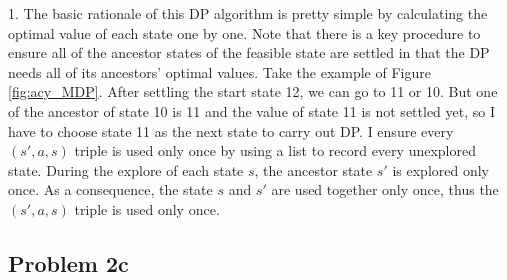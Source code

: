 \documentclass[paper=a4, fontsize=10pt]{scrartcl} %
\numberwithin{equation}{section} %
\numberwithin{figure}{section} %
\numberwithin{table}{section} %
\begin{document}
\begin{spacing}{1.}
The basic rationale of this DP algorithm is pretty simple by calculating the optimal value of each state one by one. Note that there is a key procedure to ensure all of the ancestor states of the feasible state are settled in that the DP needs all of its ancestors' optimal values. Take the example of Figure \ref{fig:acy_MDP}. After settling the start state 12, we can go to 11 or 10. But one of the ancestor of state 10 is 11 and the value of state 11 is not settled yet, so I have to choose state 11 as the next state to carry out DP. I ensure every $(s', a, s)$ triple is used only once by using a list to record every unexplored state. During the explore of each state $s$, the ancestor state $s'$ is explored only once. As a consequence, the state $s$ and $s'$ are used together only once, thus the $(s', a, s)$ triple is used only once.

\subsection{Problem 2c}










\end{spacing}
\end{document}
